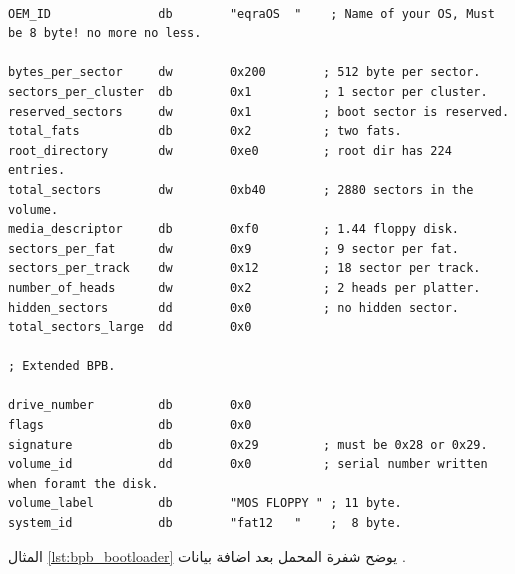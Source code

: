 \documentclass[document.tex]{subfiles}
\begin{document}
\begin{english}

\lstset{numberstyle=\tiny,numbers=left,stepnumber=1,numbersep=5pt,tabsize=2,extendedchars=true,breaklines=true,frame=b,showspaces=false, showtabs=false,xleftmargin=10pt,framexleftmargin=10pt,framexrightmargin=5pt,framexbottommargin=4pt,showstringspaces=false,language=[x86masm]Assembler}

\begin{lstlisting}[label=lst:bpb,caption=\en{Bios Parameter Block}]

OEM_ID               db        "eqraOS  "    ; Name of your OS, Must be 8 byte! no more no less.

bytes_per_sector     dw        0x200		; 512 byte per sector.
sectors_per_cluster  db        0x1          ; 1 sector per cluster.
reserved_sectors     dw        0x1          ; boot sector is reserved.
total_fats           db        0x2          ; two fats.
root_directory       dw        0xe0         ; root dir has 224 entries.
total_sectors        dw        0xb40        ; 2880 sectors in the volume.
media_descriptor     db        0xf0         ; 1.44 floppy disk.
sectors_per_fat      dw        0x9          ; 9 sector per fat.
sectors_per_track    dw        0x12         ; 18 sector per track.
number_of_heads      dw        0x2          ; 2 heads per platter.
hidden_sectors       dd        0x0          ; no hidden sector.
total_sectors_large  dd        0x0

; Extended BPB.

drive_number         db        0x0
flags                db        0x0
signature            db        0x29         ; must be 0x28 or 0x29.
volume_id            dd        0x0          ; serial number written when foramt the disk.
volume_label         db        "MOS FLOPPY " ; 11 byte.
system_id            db        "fat12   "    ;  8 byte.

\end{lstlisting}
\end{english}


المثال \ref{lst:bpb_bootloader} يوضح شفرة المحمل بعد اضافة بيانات .
\end{document}

